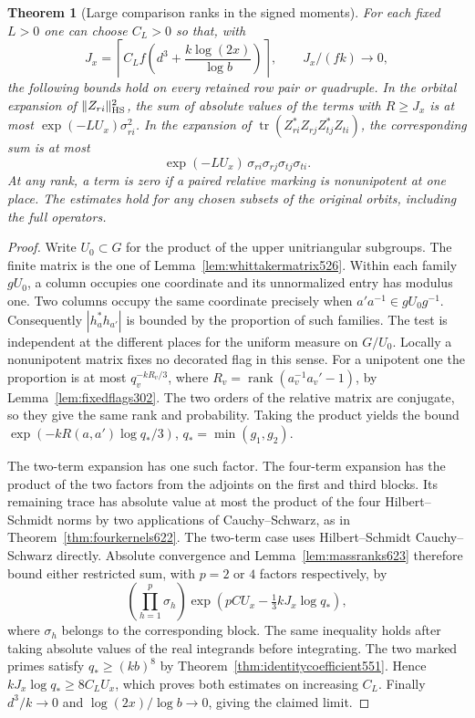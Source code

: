 \documentclass[a4paper,11pt]{article}
\newtheorem{theorem}[proposition]{Theorem}
\theoremstyle{definition}
\theoremstyle{remark}
\numberwithin{equation}{section}
\begin{document}
\begin{theorem}[Large comparison ranks in the signed moments]
\leavevmode\label{thm:markedranks623}
For each fixed \(L>0\) one can choose \(C_L>0\) so that, with
\[
    J_x=\left\lceil C_L f
               \left(d^3+\frac{k\log(2x)}{\log b}\right)\right\rceil ,
                 \qquad  J_x/(fk)\longrightarrow0 ,
\]
the following bounds hold on every retained row pair or quadruple.
In the orbital expansion of \(\|Z_{ri}\|_{\rm HS}^2\), the sum
of absolute values of the terms with \(R\ge J_x\) is at most
\(\exp(-LU_x)\sigma_{ri}^2\). In the expansion of
\(\operatorname{tr}(Z_{ri}^*Z_{rj}Z_{tj}^*Z_{ti})\), the
corresponding sum is at most
\[
       \exp(-LU_x)\,\sigma_{ri}\sigma_{rj}\sigma_{tj}\sigma_{ti}.
\]
At any rank, a term is zero if a paired relative marking is
nonunipotent at one place. The estimates hold for any chosen
subsets of the original orbits, including the full operators.
\end{theorem}
\begin{proof}
Write \(U_0\subset G\) for the product of the upper
unitriangular subgroups. The finite matrix is the one of
Lemma~\ref{lem:whittakermatrix526}. Within each family
\(gU_0\), a column occupies one coordinate and its unnormalized
entry has modulus one. Two columns occupy the same coordinate
precisely when \(a'a^{-1}\in gU_0g^{-1}\). Consequently
\(|h_a^* h_{a'}|\) is bounded by the proportion of such families.
The test is independent at the different places for the uniform
measure on \(G/U_0\). Locally a nonunipotent matrix fixes no
decorated flag in this sense. For a unipotent one the proportion
is at most \(q_v^{-k R_v/3}\), where
\(R_v=\operatorname{rank}(a_v^{-1}a_v'-1)\), by
Lemma~\ref{lem:fixedflags302}. The two orders of the relative
matrix are conjugate, so they give the same rank and probability.
Taking the product yields the bound
\(\exp(-k R(a,a')\log q_*/3)\), \(q_*=\min(g_1,g_2)\).

The two-term expansion has one such factor. The four-term
expansion has the product of the two factors from the adjoints
on the first and third blocks. Its remaining trace has absolute
value at most the product of the four Hilbert--Schmidt norms
by two applications of Cauchy--Schwarz, as in
Theorem~\ref{thm:fourkernels622}. The two-term case uses
Hilbert--Schmidt Cauchy--Schwarz directly. Absolute convergence
and Lemma~\ref{lem:massranks623} therefore bound either
restricted sum, with \(p=2\) or \(4\) factors respectively, by
\[
       \left(\prod_{h=1}^p\sigma_h\right)
           \exp\!\left(pCU_x-\tfrac13 kJ_x\log q_*\right),
\]
where \(\sigma_h\) belongs to the corresponding block.
The same inequality holds after taking absolute values of the
real integrands before integrating. The two marked primes
satisfy \(q_*\ge(kb)^8\) by Theorem~\ref{thm:identitycoefficient551}.
Hence \(kJ_x\log q_*\ge8C_LU_x\), which proves both estimates
on increasing \(C_L\). Finally \(d^3/k\to0\) and
\(\log(2x)/\log b\to0\), giving the claimed limit.
\end{proof}
\end{document}
